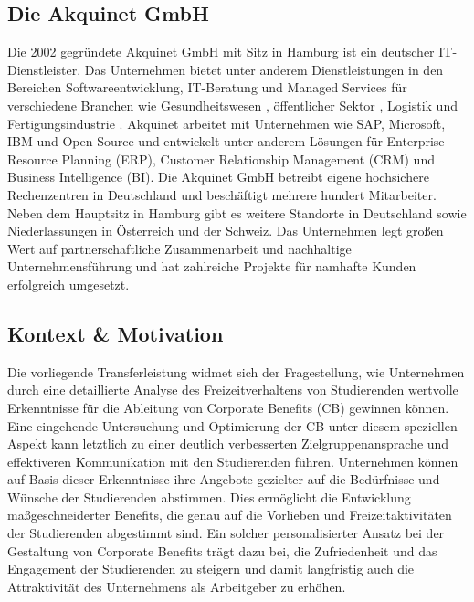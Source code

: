 \subsection{Die Akquinet GmbH}
Die 2002 gegründete Akquinet GmbH mit Sitz in Hamburg ist ein deutscher IT- Dienstleister. \cite{akquinetFirmengeschichte} Das Unternehmen bietet unter anderem Dienstleistungen in den Bereichen Softwareentwicklung, IT-Beratung und Managed Services für verschiedene Branchen wie Gesundheitswesen \cite{akquinetGesundheitswesen}, öffentlicher Sektor \cite{akquinetoffentlich}, Logistik \cite{akquinethafenlogistik} und Fertigungsindustrie \cite{akquinetindustrie}. Akquinet arbeitet mit Unternehmen wie SAP, Microsoft, IBM und Open Source und entwickelt unter anderem Lösungen für Enterprise Resource Planning (ERP), Customer Relationship Management (CRM) und Business Intelligence (BI). \newline \newline
Die Akquinet GmbH betreibt eigene hochsichere Rechenzentren in Deutschland und beschäftigt mehrere hundert Mitarbeiter.\cite{akquinetueberuns} Neben dem Hauptsitz in Hamburg gibt es weitere Standorte in Deutschland sowie Niederlassungen in Österreich und der Schweiz. Das Unternehmen legt großen Wert auf partnerschaftliche Zusammenarbeit und nachhaltige Unternehmensführung und hat zahlreiche Projekte für namhafte Kunden erfolgreich umgesetzt.\cite{akquinetFirmengeschichte}

\subsection{Kontext \& Motivation}
Die vorliegende Transferleistung widmet sich der Fragestellung, wie Unternehmen durch eine detaillierte Analyse des Freizeitverhaltens von Studierenden wertvolle Erkenntnisse für die Ableitung von Corporate Benefits (CB) gewinnen können. Eine eingehende Untersuchung und Optimierung der CB unter diesem speziellen Aspekt kann letztlich zu einer deutlich verbesserten Zielgruppenansprache und effektiveren Kommunikation mit den Studierenden führen. Unternehmen können auf Basis dieser Erkenntnisse ihre Angebote gezielter auf die Bedürfnisse und Wünsche der Studierenden abstimmen. Dies ermöglicht die Entwicklung maßgeschneiderter Benefits, die genau auf die Vorlieben und Freizeitaktivitäten der Studierenden abgestimmt sind. Ein solcher personalisierter Ansatz bei der Gestaltung von Corporate Benefits trägt dazu bei, die Zufriedenheit und das Engagement der Studierenden zu steigern und damit langfristig auch die Attraktivität des Unternehmens als Arbeitgeber zu erhöhen.

